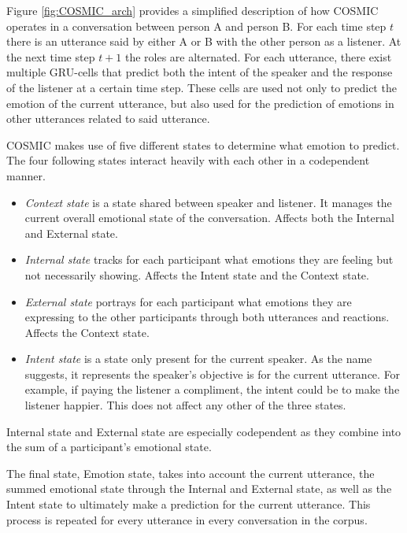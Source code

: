 \documentclass[nofilelist]{cslthse-msc}
\begin{document}


Figure \ref{fig:COSMIC_arch} provides a simplified description of how COSMIC operates in a conversation between person A and person B. For each time step $t$ there is an utterance said by either A or B with the other person as a listener. At the next time step $t+1$ the roles are alternated. For each utterance, there exist multiple GRU-cells that predict both the intent of the speaker and the response of the listener at a certain time step. These cells are used not only to predict the emotion of the current utterance, but also used for the prediction of emotions in other utterances related to said utterance. 

COSMIC makes use of five different states to determine what emotion to predict. 
The four following states interact heavily with each other in a codependent manner. 

\begin{itemize}
    \item \textit{Context state} is a state shared between speaker and listener. It manages the current overall emotional state of the conversation. Affects both the Internal and External state.
    \item \textit{Internal state} tracks for each participant what emotions they are feeling but not necessarily showing. Affects the Intent state and the Context state.
    \item \textit{External state} portrays for each participant what emotions they are expressing to the other participants through both utterances and reactions. Affects the Context state.
    \item \textit{Intent state} is a state only present for the current speaker. As the name suggests, it represents the speaker's objective is for the current utterance. For example, if paying the listener a compliment, the intent could be to make the listener happier. This does not affect any other of the three states.
\end{itemize}
Internal state and External state are especially codependent as they combine into the sum of a participant's emotional state. 

The final state, Emotion state, takes into account the current utterance, the summed emotional state through the Internal and External state, as well as the Intent state to ultimately make a prediction for the current utterance. This process is repeated for every utterance in every conversation in the corpus.
\end{document}
